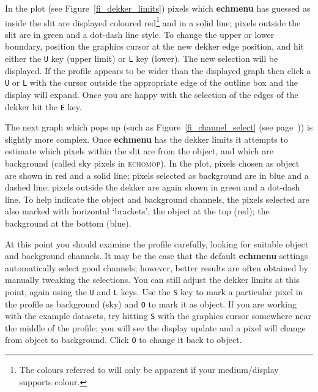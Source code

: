 \documentclass[twoside,11pt]{starlink}
\providecommand{\scspec}[2]{#1}
\begin{document}
In the plot (see \scspec{Figure~\ref{fi_dekker_limits}}{the figure above})
pixels which \textbf{echmenu} has guessed as inside the slit are
displayed coloured
red\scspec{\footnote{The colours referred to will only be apparent if your
medium/display supports colour.}}
{(the colours referred to here will only be apparent if your
medium/display supports colour)}
and in a solid line; pixels outside the slit
are in green and a dot-dash line style.  To change the upper or lower
boundary, position the graphics cursor at the new dekker edge position,
and hit either the \verb+U+ key (upper limit) or \verb+L+ key (lower).
The new selection will be displayed.  If the profile appears to be wider
than the displayed graph then click a \verb+U+ or \verb+L+ with the
cursor outside the appropriate edge of the outline box and the display
will expand.  Once you are happy with the selection of the edges of
the dekker hit the \verb+E+ key.




The next graph which pops up (such as
\scspec{Figure~\ref{fi_channel_select} (see page~\pageref{fi_channel_select})}
{the figure above}) is slightly more complex.  Once \textbf{echmenu} has the
dekker limits it attempts to estimate which pixels within the slit are from
the object, and which are background (called sky pixels in \textsc{echomop})\@.
In the plot, pixels chosen as object are shown in red and a solid line;
pixels selected as background are in blue and a dashed line;
pixels outside the dekker are again shown in green and a dot-dash line.
To help indicate the object and background channels, the pixels selected
are also marked with horizontal `brackets'; the object at the top (red);
the background at the bottom (blue).

At this point you should examine the profile carefully, looking for suitable
object and background channels.  It may be the case that the default
\textbf{echmenu} settings automatically select good channels; however, better
results are often obtained by manually tweaking the selections.
You can still adjust the dekker limits at this point, again using the
\verb+U+ and \verb+L+ keys.
Use the \verb+S+ key to mark a particular pixel in the profile as background
(sky) and \verb+O+ to mark it as object.  If you are working with the example
datasets, try hitting \verb+S+ with the graphics cursor somewhere near the
middle of the profile; you will see the display update and a pixel will
change from object to background.  Click \verb+O+ to change it back to
object.
\end{document}
